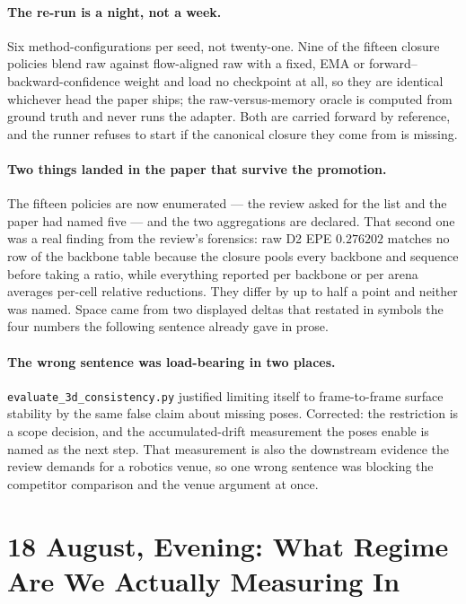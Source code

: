 \documentclass[11pt,a4paper]{article}
\begin{document}
\paragraph{The re-run is a night, not a week.} Six method-configurations per
seed, not twenty-one. Nine of the fifteen closure policies blend raw against
flow-aligned raw with a fixed, EMA or forward--backward-confidence weight and
load no checkpoint at all, so they are identical whichever head the paper ships;
the raw-versus-memory oracle is computed from ground truth and never runs the
adapter. Both are carried forward by reference, and the runner refuses to start
if the canonical closure they come from is missing.

\paragraph{Two things landed in the paper that survive the promotion.} The
fifteen policies are now enumerated --- the review asked for the list and the
paper had named five --- and the two aggregations are declared. That second one
was a real finding from the review's forensics: raw D2 EPE $0.276202$ matches no
row of the backbone table because the closure pools every backbone and sequence
before taking a ratio, while everything reported per backbone or per arena
averages per-cell relative reductions. They differ by up to half a point and
neither was named. Space came from two displayed deltas that restated in symbols
the four numbers the following sentence already gave in prose.

\paragraph{The wrong sentence was load-bearing in two places.}
\texttt{evaluate\_3d\_consistency.py} justified limiting itself to
frame-to-frame surface stability by the same false claim about missing poses.
Corrected: the restriction is a scope decision, and the accumulated-drift
measurement the poses enable is named as the next step. That measurement is also
the downstream evidence the review demands for a robotics venue, so one wrong
sentence was blocking the competitor comparison and the venue argument at once.


\section*{18 August, Evening: What Regime Are We Actually Measuring In}
\end{document}
